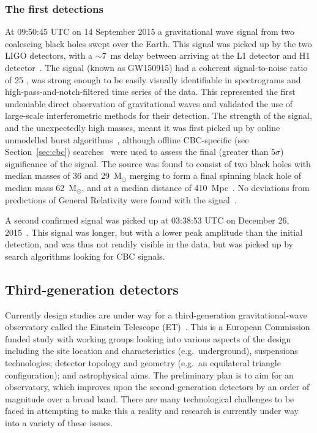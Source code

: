\subsubsection{The first detections}

At 09:50:45 UTC on 14 September 2015 a gravitational wave signal from two coalescing black holes swept 
over the Earth. This signal was picked up by the two LIGO detectors, with a $\sim 7$~ms delay between 
arriving at the L1 detector and H1 detector~\cite{GW150914}. The signal (known as GW150915) had a coherent signal-to-noise 
ratio of 25 \cite{2016PhRvL.116x1102A}, was strong enough to be easily visually identifiable in spectrograms 
and high-pass-and-notch-filtered time series of the data. This represented the first undeniable direct observation of 
gravitational waves and validated the use of large-scale interferometric methods for their detection. The strength of
the signal, and the unexpectedly high masses, meant it was first picked up by online unmodelled burst algorithms~\cite{2016PhRvD..93l2004A},
although offline CBC-specific (see Section~\ref{sec:cbc}) searches~\cite{2016CQGra..33u5004U, 2016arXiv160404324M} were used to assess
the final (greater than $5\sigma$) significance of the signal.
The source was found to consist of two black holes with median masses of 36 and 29~M$_{\odot}$ merging to form a
final spinning black hole of median mass 62~M$_{\odot}$, and at a median distance of 410~Mpc~\cite{2016PhRvL.116x1102A}.
No deviations from predictions of General Relativity were found with the signal~\cite{2016PhRvL.116v1101A}.

A second confirmed signal was picked up at 03:38:53 UTC on December 26, 2015~\cite{GW151226}. This signal
was longer, but with a lower peak amplitude than the initial detection, and was thus not readily visible in the data, but
was picked up by search algorithms looking for CBC signals.

\subsection{Third-generation detectors}
\label{subsec:et} 

Currently design studies are under way for a third-generation gravitational-wave
observatory called the Einstein Telescope (ET)~\cite{ETweb}. This is a European
Commission funded study with working groups looking into various aspects of the
design including the site location and characteristics (e.g.\, underground),
suspensions technologies; detector topology and geometry (e.g.\, an equilateral
triangle configuration); and astrophysical aims. The preliminary plan is to
aim for an observatory, which improves upon the second-generation detectors by
an order of magnitude over a broad band. There are many technological challenges
to be faced in attempting to make this a reality and research is currently under
way into a variety of these issues.

